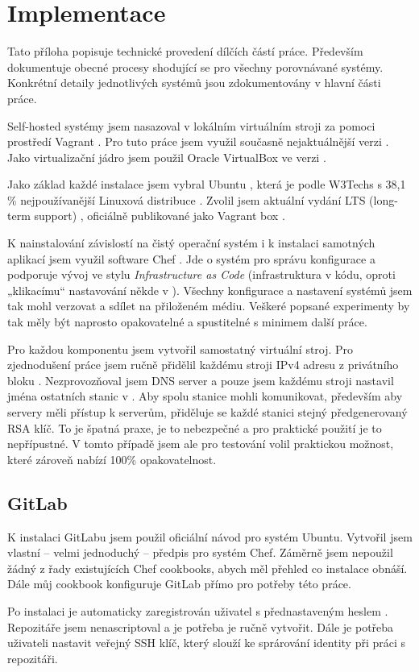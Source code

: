 \chapter{Implementace}\label{ch:implementace}

Tato příloha popisuje technické provedení dílčích částí práce. Především dokumentuje obecné procesy shodující se pro všechny porovnávané \CICD systémy. Konkrétní detaily jednotlivých systémů jsou zdokumentovány v hlavní části práce.

Self-hosted \CICD systémy jsem nasazoval v lokálním virtuálním stroji za pomoci prostředí Vagrant \cite{hashimoto-vagrant}\cite{susanka-vagrant}. Pro tuto práce jsem využil současně nejaktuálnější verzi . Jako virtualizační jádro jsem použil Oracle VirtualBox \cite{virtualbox} ve verzi .

Jako základ každé instalace jsem vybral Ubuntu \cite{ubuntu}, která je podle W3Techs s 38,1 \% nejpoužívanější Linuxová distribuce \cite{w3techs-stats}. Zvolil jsem aktuální vydání LTS (long-term support) , oficiálně publikované jako Vagrant box .

K nainstalování závislostí na čistý operační systém i k instalaci samotných aplikací jsem využil software Chef \cite{chef}. Jde o systém pro správu konfigurace a podporuje vývoj ve stylu \textit{Infrastructure as Code} (infrastruktura v kódu, oproti „klikacímu“ nastavování někde v ). Všechny konfigurace a nastavení systémů jsem tak mohl verzovat a sdílet na přiloženém médiu. Veškeré popsané experimenty by tak měly být naprosto opakovatelné a spustitelné s minimem další práce.

Pro každou komponentu jsem vytvořil samostatný virtuální stroj. Pro zjednodušení práce jsem ručně přidělil každému stroji IPv4 adresu z privátního bloku . Nezprovozňoval jsem DNS server a pouze jsem každému stroji nastavil jména ostatních stanic v . Aby spolu stanice mohli komunikovat, především aby \CD servery měli přístup k \HTTP serverům, přiděluje se každé stanici stejný předgenerovaný RSA klíč. To je špatná praxe, je to nebezpečné a pro praktické použití je to nepřípustné. V tomto případě jsem ale pro testování volil praktickou možnost, které zároveň nabízí 100\% opakovatelnost.

\section{GitLab}
    K instalaci GitLabu jsem použil oficiální návod pro systém Ubuntu. Vytvořil jsem vlastní -- velmi jednoduchý -- předpis pro systém Chef. Záměrně jsem nepoužil žádný z řady existujících Chef cookbooks, abych měl přehled co instalace obnáší. Dále můj cookbook konfiguruje GitLab přímo pro potřeby této práce.

    Po instalaci je automaticky zaregistrován uživatel  s přednastaveným heslem . Repozitáře jsem nenascriptoval a je potřeba je ručně vytvořit. Dále je potřeba uživateli nastavit veřejný SSH klíč, který slouží ke sprárování identity při práci s repozitáři.
